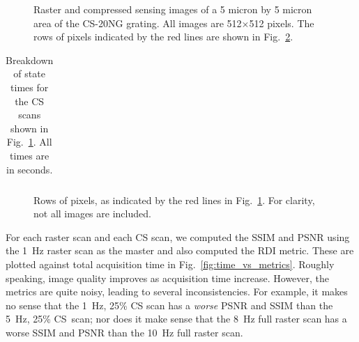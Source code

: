 \documentclass[journal]{IEEEtran}
\begin{document}
%     
\begin{figure}
  \parbox{.1\textwidth}{\phantom{p}}
  \begin{subfigure}{.8\textwidth}
  
\end{subfigure}
\begin{subfigure}[t]{.09\textwidth}
  \vspace{-18.2em}
    
  \end{subfigure}
  \caption{Raster and compressed sensing images of a 5 micron by 5 micron 
    area of the CS-20NG grating. All images are 512$\times$512 pixels.
    The rows of pixels indicated by the red lines are
    shown in Fig.~\ref{fig:pixel_rows}.}
  \label{fig:resultsF1_images}
\end{figure}

\begin{table}[t!]
  \centering
  \caption{Breakdown of state times for the CS scans shown in
    Fig.~\ref{fig:resultsF1_images}. All times are in seconds.}
  \label{tab:final_state_times}
  \begin{tabular}{ccccccc}
    
  \end{tabular}
\end{table}

\begin{figure}
  
  \caption{Rows of pixels, as indicated by the red lines in
    Fig.~\ref{fig:resultsF1_images}. For clarity, not all images are
    included.}
  \label{fig:pixel_rows}
\end{figure}
For each raster scan and each CS scan, we computed the SSIM and PSNR
using the 1~Hz raster scan as the master and also computed the RDI
metric. These are plotted against total acquisition time in
Fig.~\ref{fig:time_vs_metrics}. Roughly speaking, image quality improves as
acquisition time increase. However, the metrics are quite noisy, leading to 
several inconsistencies. For example, it makes no sense that the 1~Hz, 25\% CS
scan has a \emph{worse} PSNR and SSIM than the 5~Hz, 25\% CS~scan;
nor does it make sense that the 8~Hz full raster scan has a worse SSIM and
PSNR than the 10~Hz full raster scan.
\end{document}

